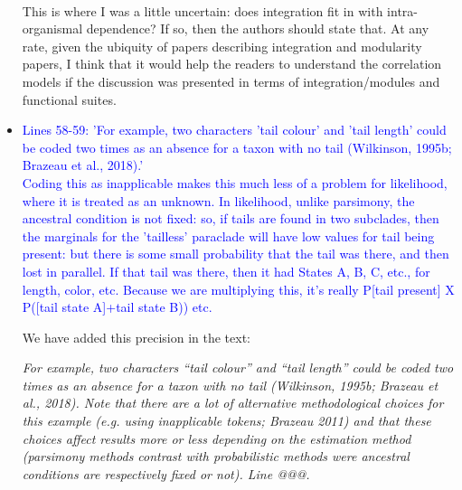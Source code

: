 \documentclass[12pt,letterpaper]{article}
\begin{document}
\begin{itemize}
{{\\
This is where I was a little uncertain: does integration fit in with intra-organismal dependence? If so, then the authors should state that. At any rate, given the ubiquity of papers describing integration and modularity papers, I think that it would help the readers to understand the correlation models if the discussion was presented in terms of integration/modules and functional suites.}}




\item{\textcolor{blue}{Lines 58-59: 'For example, two characters 'tail colour' and 'tail length' could be coded two times as an absence for a taxon with no tail (Wilkinson, 1995b; Brazeau et al., 2018).'
\\
Coding this as inapplicable makes this much less of a problem for likelihood, where it is treated as an unknown. In likelihood, unlike parsimony, the ancestral condition is not fixed: so, if tails are found in two subclades, then the marginals for the 'tailless' paraclade will have low values for tail being present: but there is some small probability that the tail was there, and then lost in parallel. If that tail was there, then it had States A, B, C, etc., for length, color, etc. Because we are multiplying this, it's really P[tail present] X P([tail state A]+tail state B)) etc.}}

We have added this precision in the text:

\textit{For example, two characters ``tail colour'' and ``tail length'' could be coded two times as an absence for a taxon with no tail (Wilkinson, 1995b; Brazeau et al., 2018). Note that there are a lot of alternative methodological choices for this example (e.g. using inapplicable tokens; Brazeau 2011) and that these choices affect results more or less depending on the estimation method (parsimony methods contrast with probabilistic methods were ancestral conditions are respectively fixed or not). Line @@@.}




\end{itemize}
\end{document}

